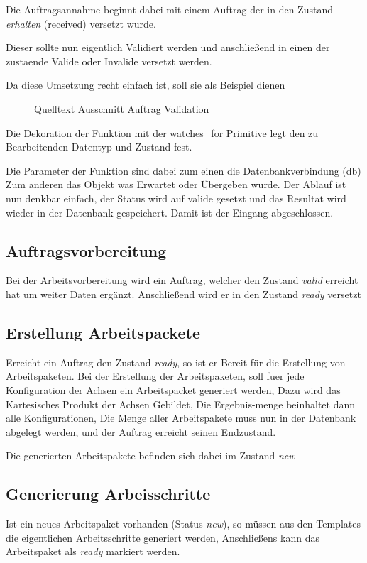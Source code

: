 \FloatBarrier
Die Auftragsannahme beginnt dabei mit einem Auftrag der in den Zustand \textit{erhalten} (received) versetzt wurde.

Dieser sollte nun eigentlich Validiert werden und anschließend in einen der zustaende Valide oder Invalide versetzt werden.

Da diese Umsetzung recht einfach ist, soll sie als Beispiel dienen
\begin{figure}[h]
\caption{Quelltext Ausschnitt Auftrag Validation}
\label{fig:auftrag-validation-code}
\end{figure}

Die Dekoration \cite{python:decorator}
der Funktion mit der watches\_for Primitive legt den zu Bearbeitenden Datentyp und Zustand fest.

Die Parameter der Funktion sind dabei zum einen die Datenbankverbindung (db)
Zum anderen das Objekt was Erwartet oder Übergeben wurde.
Der Ablauf ist nun denkbar einfach, der Status wird auf valide gesetzt und das Resultat wird wieder in der Datenbank gespeichert.
Damit ist der Eingang abgeschlossen.

\FloatBarrier
\subsection{Auftragsvorbereitung}

Bei der Arbeitsvorbereitung wird ein Auftrag,
welcher den Zustand \textit{valid} erreicht hat um weiter Daten ergänzt.
Anschließend wird er in den Zustand \textit{ready} versetzt

\subsection{Erstellung Arbeitspackete}

Erreicht ein Auftrag den Zustand \textit{ready}, so ist er Bereit für die Erstellung von Arbeitspaketen.
Bei der Erstellung der Arbeitspaketen, soll fuer jede Konfiguration der Achsen ein Arbeitspacket generiert werden,
Dazu wird das Kartesisches Produkt der Achsen Gebildet,
Die Ergebnis-menge beinhaltet dann alle Konfigurationen,
Die Menge aller Arbeitspakete muss nun in der Datenbank abgelegt werden,
und der Auftrag erreicht seinen Endzustand.

Die generierten Arbeitspakete befinden sich dabei im Zustand \textit{new}

\subsection{Generierung Arbeisschritte}
Ist ein neues Arbeitspaket vorhanden (Status \textit{new}), so müssen aus den Templates die eigentlichen Arbeitsschritte generiert werden,
Anschließens kann das Arbeitspaket als \textit{ready} markiert werden.


